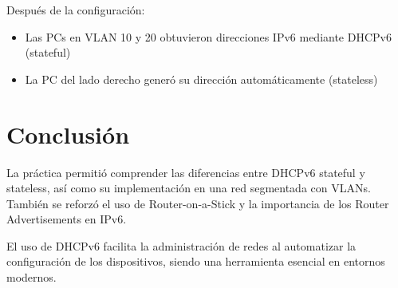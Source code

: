 \documentclass[12pt]{article}
\begin{document}
Después de la configuración:

\begin{itemize}
    \item Las PCs en VLAN 10 y 20 obtuvieron direcciones IPv6 mediante DHCPv6 (stateful)
    \item La PC del lado derecho generó su dirección automáticamente (stateless)
\end{itemize}

\section{Conclusión}

La práctica permitió comprender las diferencias entre DHCPv6 stateful y stateless, así como su implementación en una red segmentada con VLANs. 
También se reforzó el uso de Router-on-a-Stick y la importancia de los Router Advertisements en IPv6.

El uso de DHCPv6 facilita la administración de redes al automatizar la configuración de los dispositivos, siendo una herramienta esencial en entornos modernos.
\end{document}
